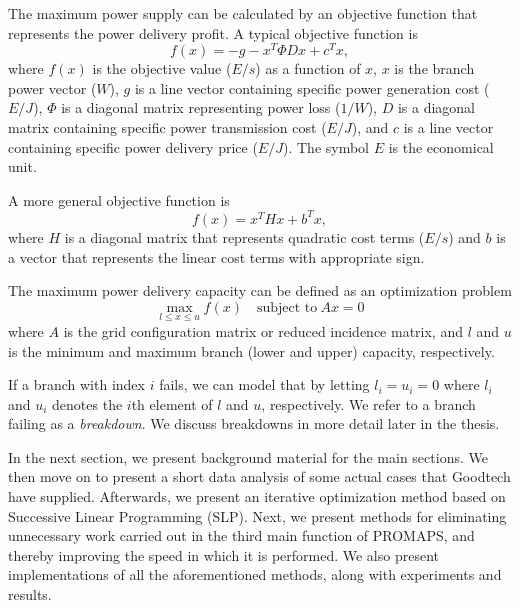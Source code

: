 \documentclass[a4paper,12pt]{report}
\begin{document}
The maximum power
supply can be calculated by an objective function that represents the power
delivery profit. A typical objective function is
\[
f(x) = -g - x^T \Phi D x + c^T x,
\]
where $f(x)$ is the objective value ($E/s$) as a function of $x$, $x$ is the
branch power vector ($W$), $g$ is a line vector containing specific power
generation cost ($E/J$), $\Phi$ is a diagonal matrix representing power loss
($1/W$), $D$ is a diagonal matrix containing specific power transmission cost
($E/J$), and $c$ is a line vector containing specific power delivery price
($E/J$).
The symbol $E$ is the economical unit\cite{digernes}.

A more general objective function is
\begin{equation}
    f(x) = x^T H x + b^T x, \label{eq:obj}
\end{equation}
where $H$ is a diagonal matrix that represents quadratic cost terms ($E/s$) and
$b$ is a vector that represents the linear cost terms with appropriate
sign\cite{digernes}.

The maximum power delivery capacity can be defined as an optimization problem
\begin{equation}
   \max_{l \le x \le u} f(x)\quad\textrm{subject to}~Ax = 0 \label{eq:thesisqp}
\end{equation}
where $A$ is the grid configuration matrix or reduced incidence matrix, and
$l$ and $u$ is the minimum and maximum branch (lower and upper) capacity,
respectively\cite{digernes}.

If a branch with index $i$ fails, we can model that by letting
$l_i = u_i = 0$ where $l_i$ and $u_i$ denotes the $i$th element of $l$ and
$u$, respectively. We refer to a branch failing as a \textit{breakdown}.
We discuss breakdowns in more detail later in the thesis.

In the next section, we present background material for the
main sections. We then move on to present a short data analysis of
some actual cases that Goodtech have supplied. Afterwards, we present
an iterative optimization method based on Successive Linear Programming (SLP).
Next, we present methods for eliminating unnecessary work carried out in the
third main function of PROMAPS, and thereby improving the speed in which it is
performed.
We also present implementations of all the aforementioned methods, along with
experiments and results.







\end{document}
